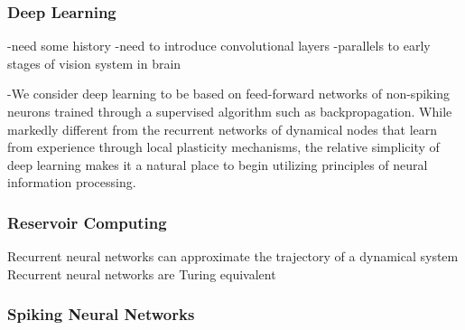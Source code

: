 \subsubsection{Deep Learning}
-need some history
-need to introduce convolutional layers
-parallels to early stages of vision system in brain

-We consider deep learning to be based on feed-forward networks of non-spiking neurons trained through a supervised algorithm such as backpropagation. While markedly different from the recurrent networks of dynamical nodes that learn from experience through local plasticity mechanisms, the relative simplicity of deep learning makes it a natural place to begin utilizing principles of neural information processing.


\subsubsection{Reservoir Computing}

\vspace{3em}
\cite{jaha2004}


\cite{mana2002}

\vspace{3em}
Recurrent neural networks can approximate the trajectory of a dynamical system \cite{funa1993}
Recurrent neural networks are Turing equivalent \cite{kisi1996}

\subsubsection{Spiking Neural Networks}
